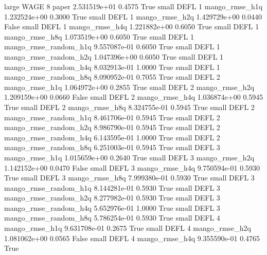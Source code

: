      large     WAGE                 8                 paper 2.531519e+01      0.4575    True
     small     DEFL                 1        mango_rmse_h1q 1.232524e+00      0.3000    True
     small     DEFL                 1        mango_rmse_h2q 1.429729e+00      0.0440   False
     small     DEFL                 1        mango_rmse_h4q 1.221882e+00      0.6050    True
     small     DEFL                 1        mango_rmse_h8q 1.073519e+00      0.6050    True
     small     DEFL                 1 mango_rmse_random_h1q 9.557087e-01      0.6050    True
     small     DEFL                 1 mango_rmse_random_h2q 1.047396e+00      0.6050    True
     small     DEFL                 1 mango_rmse_random_h4q 8.032913e-01      1.0000    True
     small     DEFL                 1 mango_rmse_random_h8q 8.090952e-01      0.7055    True
     small     DEFL                 2        mango_rmse_h1q 1.064972e+00      0.2855    True
     small     DEFL                 2        mango_rmse_h2q 1.209159e+00      0.0660   False
     small     DEFL                 2        mango_rmse_h4q 1.036874e+00      0.5945    True
     small     DEFL                 2        mango_rmse_h8q 8.324755e-01      0.5945    True
     small     DEFL                 2 mango_rmse_random_h1q 8.461706e-01      0.5945    True
     small     DEFL                 2 mango_rmse_random_h2q 8.986790e-01      0.5945    True
     small     DEFL                 2 mango_rmse_random_h4q 6.143595e-01      1.0000    True
     small     DEFL                 2 mango_rmse_random_h8q 6.251003e-01      0.5945    True
     small     DEFL                 3        mango_rmse_h1q 1.015659e+00      0.2640    True
     small     DEFL                 3        mango_rmse_h2q 1.142152e+00      0.0470   False
     small     DEFL                 3        mango_rmse_h4q 9.750594e-01      0.5930    True
     small     DEFL                 3        mango_rmse_h8q 7.999380e-01      0.5930    True
     small     DEFL                 3 mango_rmse_random_h1q 8.144281e-01      0.5930    True
     small     DEFL                 3 mango_rmse_random_h2q 8.277982e-01      0.5930    True
     small     DEFL                 3 mango_rmse_random_h4q 5.652976e-01      1.0000    True
     small     DEFL                 3 mango_rmse_random_h8q 5.786254e-01      0.5930    True
     small     DEFL                 4        mango_rmse_h1q 9.631708e-01      0.2675    True
     small     DEFL                 4        mango_rmse_h2q 1.081062e+00      0.0565   False
     small     DEFL                 4        mango_rmse_h4q 9.355590e-01      0.4765    True
